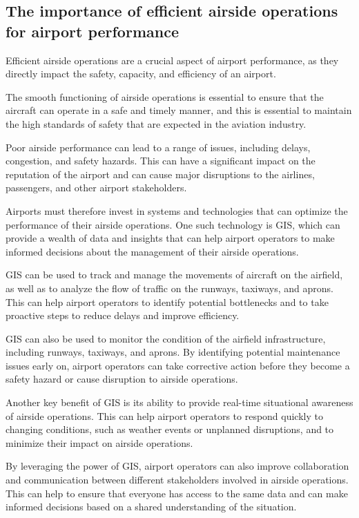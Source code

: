     \subsection{The importance of efficient airside operations for airport performance}

    Efficient airside operations are a crucial aspect of airport performance, as they directly impact the safety, capacity, and efficiency of an airport.

    The smooth functioning of airside operations is essential to ensure that the aircraft can operate in a safe and timely manner, and this is essential to maintain the high standards of safety that are expected in the aviation industry.

    Poor airside performance can lead to a range of issues, including delays, congestion, and safety hazards. This can have a significant impact on the reputation of the airport and can cause major disruptions to the airlines, passengers, and other airport stakeholders.

    Airports must therefore invest in systems and technologies that can optimize the performance of their airside operations. One such technology is GIS, which can provide a wealth of data and insights that can help airport operators to make informed decisions about the management of their airside operations.

    GIS can be used to track and manage the movements of aircraft on the airfield, as well as to analyze the flow of traffic on the runways, taxiways, and aprons. This can help airport operators to identify potential bottlenecks and to take proactive steps to reduce delays and improve efficiency.

    GIS can also be used to monitor the condition of the airfield infrastructure, including runways, taxiways, and aprons. By identifying potential maintenance issues early on, airport operators can take corrective action before they become a safety hazard or cause disruption to airside operations.

    Another key benefit of GIS is its ability to provide real-time situational awareness of airside operations. This can help airport operators to respond quickly to changing conditions, such as weather events or unplanned disruptions, and to minimize their impact on airside operations.

    By leveraging the power of GIS, airport operators can also improve collaboration and communication between different stakeholders involved in airside operations. This can help to ensure that everyone has access to the same data and can make informed decisions based on a shared understanding of the situation.

